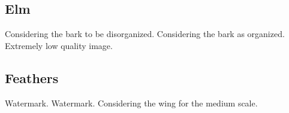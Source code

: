\clearpage
\renewcommand{\matName}{Elm}
\subsection{\matName}

\renewcommand{\imgNumber}{01}
{}{Considering the bark to be disorganized.}
\renewcommand{\imgNumber}{02}
{}{}
\renewcommand{\imgNumber}{03}
{}{}
\renewcommand{\imgNumber}{04}
{}{}
\renewcommand{\imgNumber}{05}
{}{}
\renewcommand{\imgNumber}{06}
{}{Considering the bark as organized.}
\renewcommand{\imgNumber}{07}
{}{}
\renewcommand{\imgNumber}{08}
{}{}
\renewcommand{\imgNumber}{09}
{}{}
\renewcommand{\imgNumber}{10}
{}{}
\renewcommand{\imgNumber}{11}
{Extremely low quality image.}{}
\renewcommand{\imgNumber}{12}
{}{}

\clearpage
\renewcommand{\matName}{Feathers}
\subsection{\matName}

\renewcommand{\imgNumber}{01}
{Watermark.}{}
\renewcommand{\imgNumber}{02} 
{}{}
\renewcommand{\imgNumber}{03} 
{}{}
\renewcommand{\imgNumber}{04}
{}{}
\renewcommand{\imgNumber}{05}
{Watermark.}{}
\renewcommand{\imgNumber}{06}
{}{}
\renewcommand{\imgNumber}{07}
{}{}
\renewcommand{\imgNumber}{08}
{}{}
\renewcommand{\imgNumber}{09}
{}{}
\renewcommand{\imgNumber}{10}
{}{Considering the wing for the medium scale.}
\renewcommand{\imgNumber}{11}
{}{}
\renewcommand{\imgNumber}{12}
{}{}

